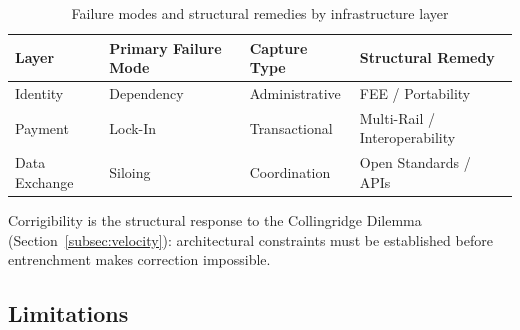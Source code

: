 \documentclass{article}
\begin{document}
\begin{table}[htbp]
\centering
\caption{Failure modes and structural remedies by infrastructure layer}
\label{tab:topological-risk}
\begin{tabular}{llll}
\toprule
\textbf{Layer} & \textbf{Primary Failure Mode} & \textbf{Capture Type} & \textbf{Structural Remedy} \\
\midrule
Identity & Dependency & Administrative & FEE / Portability \\
Payment & Lock-In & Transactional & Multi-Rail / Interoperability \\
Data Exchange & Siloing & Coordination & Open Standards / APIs \\
\bottomrule
\end{tabular}
\end{table}

Corrigibility is the structural response to the Collingridge Dilemma (Section~\ref{subsec:velocity}): architectural constraints must be established before entrenchment makes correction impossible.

\subsection{Limitations}
\label{subsec:limitations}
\end{document}
